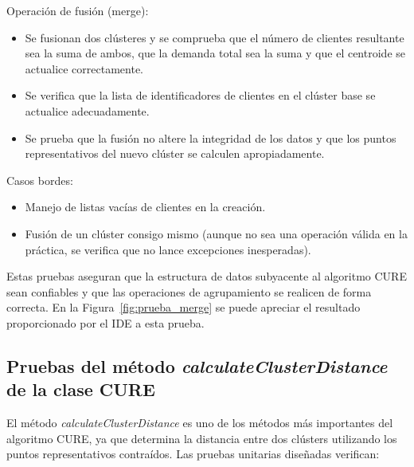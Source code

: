 Operaci\'on de fusi\'on (merge):

\begin{itemize}
  \item Se fusionan dos cl\'usteres y se comprueba que el n\'umero de clientes resultante sea la suma de ambos, que la demanda total sea la suma y que el centroide se actualice correctamente.
  \item Se verifica que la lista de identificadores de clientes en el cl\'uster base se actualice adecuadamente.
  \item Se prueba que la fusi\'on no altere la integridad de los datos y que los puntos representativos del nuevo cl\'uster se calculen apropiadamente.
\end{itemize}

Casos bordes:

\begin{itemize}
  \item Manejo de listas vac\'ias de clientes en la creaci\'on.
  \item Fusi\'on de un cl\'uster consigo mismo (aunque no sea una operaci\'on v\'alida en la pr\'actica, se verifica que no lance excepciones inesperadas).
\end{itemize}

Estas pruebas aseguran que la estructura de datos subyacente al algoritmo CURE sean confiables y que las operaciones de agrupamiento se realicen de forma correcta. En la Figura~\ref{fig:prueba_merge} se puede apreciar el resultado proporcionado por el IDE a esta prueba.


\subsection{Pruebas del m\'etodo \textit{calculateClusterDistance} de la clase CURE}

El m\'etodo \textit{calculateClusterDistance} es uno de los m\'etodos m\'as importantes del algoritmo CURE, ya que determina la distancia entre dos cl\'usters utilizando los puntos representativos contra\'idos. Las pruebas unitarias dise\~nadas verifican:

